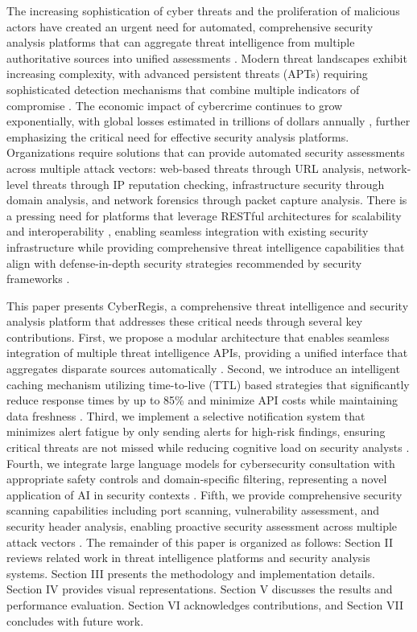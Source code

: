 \documentclass[conference]{IEEEtran}
\begin{document}
The increasing sophistication of cyber threats and the proliferation of malicious actors have created an urgent need for automated, comprehensive security analysis platforms that can aggregate threat intelligence from multiple authoritative sources into unified assessments \cite{b1}. Modern threat landscapes exhibit increasing complexity, with advanced persistent threats (APTs) requiring sophisticated detection mechanisms that combine multiple indicators of compromise \cite{b5}. The economic impact of cybercrime continues to grow exponentially, with global losses estimated in trillions of dollars annually \cite{b6}, further emphasizing the critical need for effective security analysis platforms. Organizations require solutions that can provide automated security assessments across multiple attack vectors: web-based threats through URL analysis, network-level threats through IP reputation checking, infrastructure security through domain analysis, and network forensics through packet capture analysis. There is a pressing need for platforms that leverage RESTful architectures for scalability and interoperability \cite{b7}, enabling seamless integration with existing security infrastructure while providing comprehensive threat intelligence capabilities that align with defense-in-depth security strategies recommended by security frameworks \cite{b9}.

This paper presents CyberRegis, a comprehensive threat intelligence and security analysis platform that addresses these critical needs through several key contributions. First, we propose a modular architecture that enables seamless integration of multiple threat intelligence APIs, providing a unified interface that aggregates disparate sources automatically \cite{b20}. Second, we introduce an intelligent caching mechanism utilizing time-to-live (TTL) based strategies that significantly reduce response times by up to 85\% and minimize API costs while maintaining data freshness \cite{b18,b19}. Third, we implement a selective notification system that minimizes alert fatigue by only sending alerts for high-risk findings, ensuring critical threats are not missed while reducing cognitive load on security analysts \cite{b2,b13}. Fourth, we integrate large language models for cybersecurity consultation with appropriate safety controls and domain-specific filtering, representing a novel application of AI in security contexts \cite{b15,b16}. Fifth, we provide comprehensive security scanning capabilities including port scanning, vulnerability assessment, and security header analysis, enabling proactive security assessment across multiple attack vectors \cite{b5,b9}. The remainder of this paper is organized as follows: Section II reviews related work in threat intelligence platforms and security analysis systems. Section III presents the methodology and implementation details. Section IV provides visual representations. Section V discusses the results and performance evaluation. Section VI acknowledges contributions, and Section VII concludes with future work.
\end{document}

